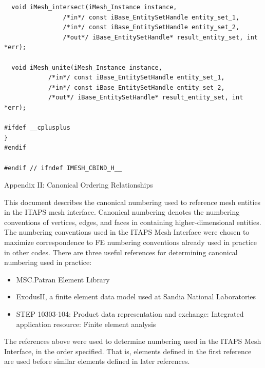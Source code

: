 \documentclass{article}
\begin{document}
\begin{small}
\begin{verbatim}
  void iMesh_intersect(iMesh_Instance instance,
			    /*in*/ const iBase_EntitySetHandle entity_set_1,
			    /*in*/ const iBase_EntitySetHandle entity_set_2,
			    /*out*/ iBase_EntitySetHandle* result_entity_set, int *err);

  void iMesh_unite(iMesh_Instance instance,
			/*in*/ const iBase_EntitySetHandle entity_set_1,
			/*in*/ const iBase_EntitySetHandle entity_set_2,
			/*out*/ iBase_EntitySetHandle* result_entity_set, int *err);

#ifdef __cplusplus
}
#endif

#endif // ifndef IMESH_CBIND_H__

\end{verbatim}
\end{small}

\newpage
\begin{Large}
{Appendix II: Canonical Ordering Relationships\\}    %
\end{Large}
\vspace{.2in}


This document describes the canonical numbering used 
to reference mesh entities in the ITAPS mesh interface. Canonical 
numbering denotes the numbering conventions of vertices, edges, 
and faces in containing higher-dimensional entities.\\

The numbering conventions used in the ITAPS Mesh Interface were 
chosen to maximize correspondence to FE numbering conventions 
already used in practice in other codes. There are three useful 
references for determining canonical numbering used in practice:
\begin{itemize}
\item  MSC.Patran Element Library
\item  ExodusII, a finite element data model used at Sandia National 
Laboratories
\item  STEP 10303-104: Product data representation and exchange: 
Integrated application resource: Finite element analysis
\end{itemize}

The references above were used to determine numbering used in 
the ITAPS Mesh Interface, in the order specified. That is, elements 
defined in the first reference are used before similar elements 
defined in later references.\\
\end{document}
